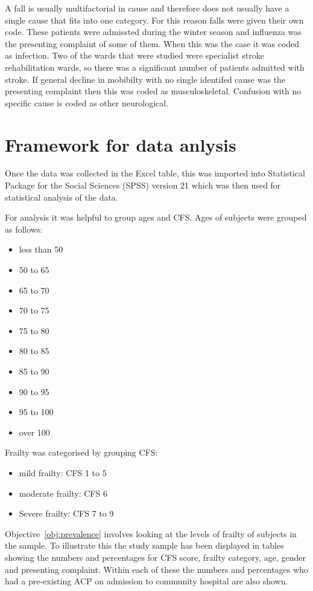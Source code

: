 \documentclass
[
	12pt,
	a4paper,
	oneside,
]{report}
\begin{document}
A fall is usually multifactorial in cause \parencite{silver:12} and therefore
does not usually have a single cause that fits into one category. For this 
reason falls were given their own code.
These patients were admissted during the winter season and influenza was the
presenting complaint of some of them. When this was the case it was coded as
infection. Two of the wards that were studied were specialist stroke 
rehabilitation wards, so there was a significant number of patients admitted
with stroke. If general decline in mobibilty with no single identifed cause
was the presenting complaint then this was coded as musculoskeletal.
Confusion with no specific cause is coded as other neurological.



\section{Framework for data anlysis}

Once the data was collected in the Excel table, this was imported into 
Statistical Package for the Social Sciences (SPSS) version 21 which was then
used for statistical analysis of the data.

For analysis it was helpful to group ages and CFS. Ages of subjects were 
grouped as follows:
\begin{itemize}
	\item less than 50
	\item 50 to 65
	\item 65 to 70
	\item 70 to 75
 	\item 75 to 80
	\item 80 to 85
 	\item 85 to 90
 	\item 90 to 95
 	\item 95 to 100
 	\item over 100
\end{itemize}

Frailty was categorised by grouping CFS:
\begin{itemize}
\label{ref:cfs-grouping}
	\item mild frailty: CFS 1 to 5
	\item moderate frailty: CFS 6
	\item Severe frailty: CFS 7 to 9
\end{itemize}

Objective~\ref{obj:prevalence} involves looking at the levels of frailty of
subjects in the sample. To illustrate this the study sample has been 
displayed in tables showing the numbers and percentages for CFS score, 
frailty category, age, gender and presenting complaint. Within each
of these the numbers and percentages who had a pre-existing ACP
on admission to community hospital are also shown.
\end{document}
